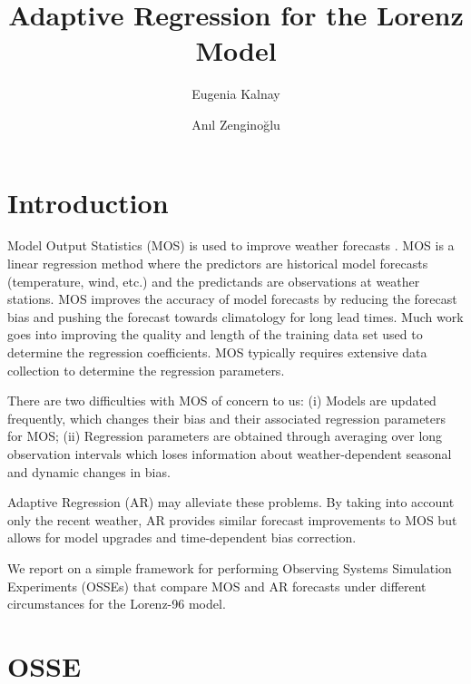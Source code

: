 \documentclass[10pt]{article}
\begin{document}
 

\title{Adaptive Regression for the Lorenz Model}
\author[1,2]{Eugenia Kalnay}
\author[2]{An\i l Zengino\u{g}lu}
\renewcommand\Affilfont{\itshape\small}
\date{}

\maketitle

\section{Introduction}
Model Output Statistics (MOS) is used to improve weather forecasts \cite{Glahn72, Carter89}. MOS is a linear regression method where the predictors are historical model forecasts (temperature, wind, etc.) and the predictands are observations at weather stations. MOS improves the accuracy of model forecasts by reducing the forecast bias and pushing the forecast towards climatology for long lead times. Much work goes into improving the quality and length of the training data set used to determine the regression coefficients. MOS typically requires extensive data collection to determine the regression parameters.

There are two difficulties with MOS of concern to us: (i) Models are updated frequently, which changes their bias and their associated regression parameters for MOS; (ii) Regression parameters are obtained through averaging over long observation intervals which loses information about weather-dependent seasonal and dynamic changes in bias.

Adaptive Regression (AR) may alleviate these problems. By taking into account only the recent weather, AR provides similar forecast improvements to MOS but allows for model upgrades and time-dependent bias correction. 

We report on a simple framework for performing Observing Systems Simulation Experiments (OSSEs) that compare MOS and AR forecasts under different circumstances for the Lorenz-96 model. 

\section{OSSE}
\end{document}
